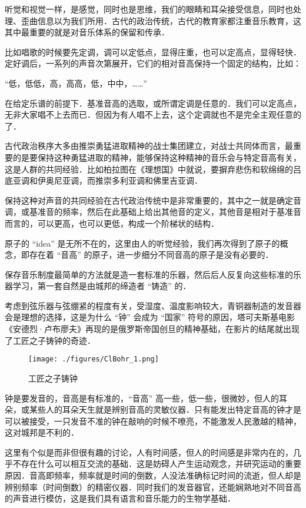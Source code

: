 听觉和视觉一样，是感觉，同时也是思维，我们的眼睛和耳朵接受信息，同时也处理、歪曲信息以为我们所用．古代的政治传统，古代的教育家都注重音乐教育，这其中最重要的就是对音乐体系的保留和传承．

比如唱歌的时候要先定调，调可以定低点，显得庄重，也可以定高点，显得轻快．定好调后，一系列的声音次第展开，它们的相对音高保持一个固定的结构，比如：

“低，低低，高，高高，低，中中，……”

在给定乐谱的前提下．基准音高的选取，或所谓定调是任意的．我们可以定高点，无非大家唱不上去而已．但因为有人唱不上去，这个定调就也不是完全主观任意的了．

古代政治秩序大多由推崇勇猛进取精神的战士集团建立，对战士共同体而言，最重要的是要保持这种勇猛进取的精神，能够保持这种精神的音乐会与特定音高有关，这是人群的共同经验．比如柏拉图在《理想国》中就说，要摒弃悲伤和软绵绵的吕底亚调和伊奥尼亚调，而推崇多利亚调和佛里吉亚调．

保持这种对声音的共同经验在古代政治传统中是非常重要的，其中之一就是确定音调，或基准音的频率，然后在此基础上给出其他音的定义，其他音是相对于基准音而言的，可以更高，也可以更低，构成一个阶梯状的结构．

原子的 “idea” 是无所不在的，这里由人的听觉经验，我们再次得到了原子的概念，即存在着 “音高” 的原子，进一步细分不同音高的原子是没有必要的．

保存音乐制度最简单的方法就是造一套标准的乐器，然后后人反复向这些标准的乐器学习，第一套自然是由城邦的缔造者 “铸造” 的．

考虑到弦乐器与弦绷紧的程度有关，受湿度、温度影响较大，青铜器制造的发音器会是理想的选择，这是为什么 “钟” 会成为 “国家” 符号的原因，塔可夫斯基电影《安德烈·卢布廖夫》再现的是俄罗斯帝国创旦的精神基础，在影片的结尾就出现了工匠之子铸钟的奇迹．

\begin{figure}[ht]
\centering
\texttt{[image: ./figures/ClBohr\_1.png]}
\caption{工匠之子铸钟} \label{ClBohr_fig1}
\end{figure}


钟是要发音的，音高是有标准的，“音高” 高一些，低一些，很微妙，但人的耳朵，或某些人的耳朵天生就是辨别音高的灵敏仪器．只有能发出特定音高的钟才是可以被接受，一只发音不准的钟在敲响的时候不嘹亮，不能激发人民激越的精神，这对城邦是不利的．

这里有个似是而非但很有趣的讨论，人有时间感，但人的时间感是非常内在的，几乎不存在什么可以相互交流的基础．这是妨碍人产生运动观念，并研究运动的重要原因．音高即频率，频率就是时间的倒数，人没法准确标记时间的流逝，但人却是辨别频率（时间倒数）的精密仪器．同时我们的发音器官，还能娴熟地对不同音高的声音进行模仿，这是我们具有语言和音乐能力的生物学基础．

